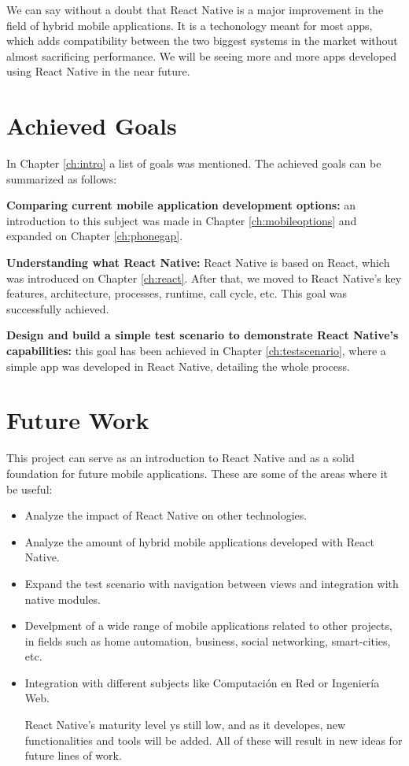 We can say without a doubt that React Native is a major improvement in the field of hybrid mobile applications. It is a techonology meant for most apps, which adds compatibility between the two biggest systems in the market without almost sacrificing performance. We will be seeing more and more apps developed using React Native in the near future.

\section{Achieved Goals}

In Chapter \ref{ch:intro} a list of goals was mentioned. The achieved goals can be summarized as follows:

\begin{description}
 \item \textbf{Comparing current mobile application development options:} an introduction to this subject was made in Chapter \ref{ch:mobileoptions} and expanded on Chapter \ref{ch:phonegap}.
 \item \textbf{Understanding what React Native:} React Native is based on React, which was introduced on Chapter \ref{ch:react}. After that, we moved to React Native's key features, architecture, processes, runtime, call cycle, etc. This goal was successfully achieved.
 \item \textbf{Design and build a simple test scenario to demonstrate React Native's capabilities:} this goal has been achieved in Chapter \ref{ch:testscenario}, where a simple app was developed in React Native, detailing the whole process.
\end{description}

\section{Future Work}

This project can serve as an introduction to React Native and as a solid foundation for future mobile applications. These are some of the areas where it  be useful:

\begin{itemize}
 \item Analyze the impact of React Native on other technologies.
 \item Analyze the amount of hybrid mobile applications developed with React Native.
 \item Expand the test scenario with navigation between views and integration with native modules.
 \item Develpment of a wide range of mobile applications related to other projects, in fields such as home automation, business, social networking, smart-cities, etc.
 \item Integration with different subjects like Computación en Red or Ingeniería Web.
 
 React Native's maturity level ys still low, and as it developes, new functionalities and tools will be added. All of these will result in new ideas for future lines of work.
\end{itemize}
